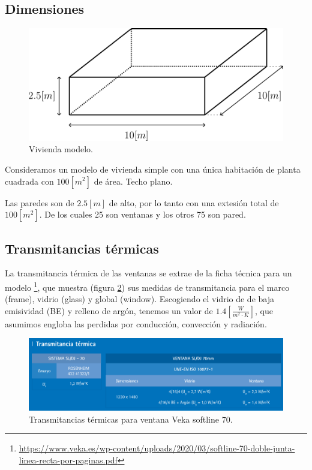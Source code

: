 \subsection{Dimensiones}

\begin{figure}[h] \centering
	\centering
	\includegraphics[width=1\textwidth]{./capitulos/resultados_discusion/images/modelo_vivienda.png}
	\caption{Vivienda modelo.}
	\label{fig:modelo_vivienda}
\end{figure}

Consideramos un modelo de vivienda simple con una única habitación de planta
cuadrada con $100[m^2]$ de área. Techo plano.

Las paredes son de $2.5[m]$ de alto, por lo tanto con una extesión total de
$100[m^2]$. De los cuales 25 son ventanas y los otros 75 son pared.


\subsection{Transmitancias térmicas}

La transmitancia térmica de las ventanas se extrae de la ficha técnica para un
modelo
\footnote{\url{https://www.veka.es/wp-content/uploads/2020/03/softline-70-doble-junta-linea-recta-por-paginas.pdf}},
que muestra (figura \ref{fig:window_tranmittance}) sus medidas de transmitancia
para el marco (frame), vidrio (glass) y global (window). Escogiendo el vidrio
de de baja emisividad (BE) y relleno de argón, tenemos un valor de
$1.4\left[\frac{W}{m^2 \cdot K}\right]$, que asumimos engloba las perdidas por
conducción, convección y radiación.

\begin{figure}[h] \centering
	\centering
	\includegraphics[width=1\textwidth]{./capitulos/resultados_discusion/images/window_transmittance.png}
	\caption{Transmitancias térmicas para ventana Veka softline 70.}
	\label{fig:window_tranmittance}
\end{figure}


